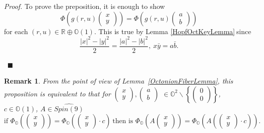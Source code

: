 \documentclass[a4paper]{article}%
\newtheorem{remark}[theorem]{Remark}
\newenvironment{proof}[1][Proof]{\noindent\textit{#1.} }{}
\begin{document}
\begin{proof}
To prove the preposition, it is enough to show
\[
\Phi\left(  g\left(  r,u\right)
\begin{pmatrix}
x\\
y
\end{pmatrix}
\right)  =\Phi\left(  g\left(  r,u\right)
\begin{pmatrix}
a\\
b
\end{pmatrix}
\right)
\]
for each $\left(  r,u\right)  \in\mathbb{R\oplus O}\left(  1\right)  $. This
is true by Lemma \ref{HopfOctKeyLemma}$\ $since
\[
\frac{\left\vert x\right\vert ^{2}-\left\vert y\right\vert ^{2}}{2}%
=\frac{\left\vert a\right\vert ^{2}-\left\vert b\right\vert ^{2}}{2}%
,\ x\bar{y}=a\bar{b}\text{.}%
\]


\ $\blacksquare$
\end{proof}

\begin{remark}
From the point of view of Lemma\ \ref{OctonionFiberLemma}, this proposition is
equivalent to that for $%
\begin{pmatrix}
x\\
y
\end{pmatrix}
,%
\begin{pmatrix}
a\\
b
\end{pmatrix}
$ $\in\mathbb{O}^{2}\smallsetminus\left\{
\begin{pmatrix}
0\\
0
\end{pmatrix}
\right\}  $, $c\in\mathbb{O}\left(  1\right)  $, $A\in\widehat{Spin(9)}$%
\[
\text{if\ \ }\Phi_{\mathbb{O}}\left(
\begin{pmatrix}
x\\
y
\end{pmatrix}
\right)  =\Phi_{\mathbb{O}}\left(
\begin{pmatrix}
x\\
y
\end{pmatrix}
\cdot c\right)  \ \text{then is\ }\Phi_{\mathbb{O}}\left(  A%
\begin{pmatrix}
x\\
y
\end{pmatrix}
\right)  =\Phi_{\mathbb{O}}\left(  A\left(
\begin{pmatrix}
x\\
y
\end{pmatrix}
\cdot c\right)  \right)  \text{.}%
\]

\end{remark}
\end{document}

